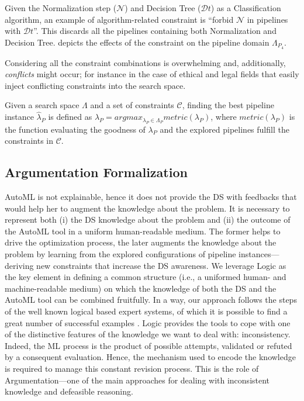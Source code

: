 \begin{example}[Constraint]
Given the Normalization step ($\mathcal{N}$) and Decision Tree ($\mathcal{D}t$) as a Classification algorithm, an example of algorithm-related constraint is ``forbid $\mathcal{N}$ in pipelines with $\mathcal{D}t$''.
This discards all the pipelines containing both Normalization and Decision Tree.
 depicts the effects of the constraint on the pipeline domain $\Lambda_{P_4}$.
\label{ex:constraints}
\end{example}

Considering all the constraint combinations is overwhelming and, additionally, \emph{conflicts} might occur; for instance in the case of ethical \cite{boston-house} and legal fields that easily inject conflicting constraints into the search space.

\begin{definition}
Given a search space $\Lambda$ and a set of constraints $\mathcal{C}$, finding the best pipeline instance $\hat{\lambda}_P$ is defined as $\hat{\lambda}_P = argmax_{\lambda_P \in \Lambda_P} metric(\lambda_P)$, where $metric(\lambda_P)$ is the function evaluating the goodness of $\lambda_P$ and the explored pipelines fulfill the constraints in $\mathcal{C}$.
\end{definition}

\subsection{Argumentation Formalization}

AutoML is not explainable, hence it does not provide the DS with feedbacks that would help her to augment the knowledge about the problem.
It is necessary to represent both (i) the DS knowledge about the problem and (ii) the outcome of the AutoML tool in a uniform human-readable medium.
The former helps to drive the optimization process,
the later augments the knowledge about the problem by learning from the explored configurations of pipeline instances---deriving new constraints that increase the DS awareness.
We leverage Logic as the key element in defining a common structure (i.e., a uniformed human- and machine-readable medium) on which the knowledge of both the DS and the AutoML tool can be combined fruitfully.
In a way, our approach follows the steps of the well known logical based expert systems, of which it is possible to find a great number of successful examples \cite{tan17es}.
Logic provides the tools to cope with one of the distinctive features of the knowledge we want to deal with: inconsistency. Indeed, the ML process is the product of possible attempts, validated or refuted by a consequent evaluation. Hence, the mechanism used to encode the knowledge is required to manage this constant revision process.
This is the role of Argumentation---one of the main approaches for dealing with inconsistent knowledge and defeasible reasoning. 


